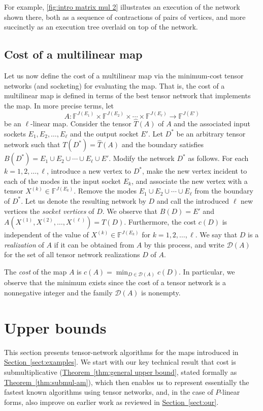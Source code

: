 \documentclass[11pt]{article}
\numberwithin{equation}{section}
\theoremstyle{definition}
\theoremstyle{plain}
\newcommand{\expref}[2]{\hyperref[#2]{#1~\ref{#2}}}
\newcommand{\F}{\ensuremath{\mathbb{F}}}
\begin{document}
For example, \eqref{fig:intro matrix mul 2} illustrates an execution
of the network shown there, both as a sequence of contractions of
pairs of vertices, and more succinctly as an execution tree overlaid
on top of the network.

\subsection{Cost of a multilinear map}
\label{sec:map cost}

Let us now define the cost of a multilinear map via the minimum-cost
tensor networks (and socketing) for evaluating the map.
That is, the cost of a multilinear map is defined in
terms of the best tensor network that implements the map.
In more precise terms, let
\[
A:\F^{J(E_1)}\times\F^{J(E_2)}\times\cdots \times\F^{J(E_\ell)}
      \rightarrow \F^{J(E')}
\]
be an $\ell$-linear map. Consider the tensor $\hat{T}(A)$ of $A$ and the
associated input sockets $E_1,E_2,\ldots,E_\ell$ and the output socket
$E'$. Let $D^*$ be an arbitrary tensor network such that $T(D^*)=\hat{T}(A)$ and
the boundary satisfies $B(D^*) =E_1\cup E_2\cup\cdots\cup E_\ell\cup E'$.
Modify the network $D^*$ as follows.
For each $k=1,2,\ldots,\ell$, introduce a new vertex to $D^*$,
make the new vertex incident to each of the modes in the input socket $E_k$,
and associate the new vertex with a tensor $X^{(k)}\in\F^{J(E_k)}$.
Remove the modes $E_1\cup E_2\cup\cdots\cup E_\ell$ from the boundary of $D^*$.
Let us denote the resulting network by $D$ and call the introduced $\ell$
new vertices the \emph{socket vertices} of $D$.
We observe that $B(D)=E'$ and $A(X^{(1)},X^{(2)},\ldots,X^{(\ell)})=T(D)$.
Furthermore, the cost $c(D)$ is independent of the value of
$X^{(k)}\in\F^{J(E_k)}$ for $k=1,2,\ldots,\ell$.
We say that $D$ is a \emph{realization} of $A$ if it can be obtained
from $A$ by this process, and write $\mathscr{D}(A)$ for the set of all
tensor network realizations $D$ of $A$.

The \emph{cost} of the map $A$ is
$c(A)=\min_{D\in\mathscr{D}(A)} c(D)$.
In particular, we observe that the minimum exists since the cost of a
tensor network is a nonnegative integer and the family $\mathscr{D}(A)$
is nonempty.

\section{Upper bounds}
\label{sec:upper bounds}

This section presents tensor-network algorithms for the maps
introduced in \expref{Section}{sect:examples}. We start with our key technical result
that cost is submultiplicative (\expref{Theorem}{thm:general upper bound},
stated formally as \expref{Theorem}{thm:submul-am}),
which then enables us to represent essentially the fastest known algorithms
using tensor networks, and, in the case of $P$-linear forms, also
improve on earlier work as reviewed in \expref{Section}{sect:our}.
\end{document}
